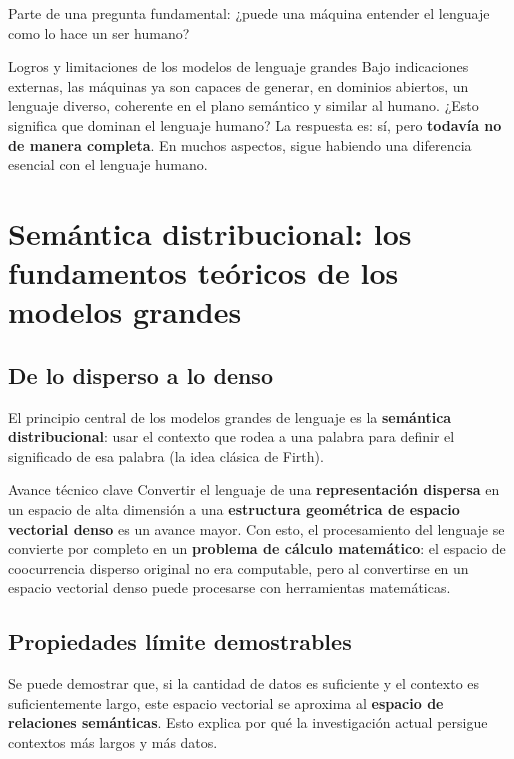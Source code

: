 \documentclass[a4paper]{article}
\begin{document}
Parte de una pregunta fundamental: ¿puede una máquina entender el lenguaje como lo hace un ser humano?

\begin{importantbox}{Logros y limitaciones de los modelos de lenguaje grandes}
Bajo indicaciones externas, las máquinas ya son capaces de generar, en dominios abiertos, un lenguaje diverso, coherente en el plano semántico y similar al humano. ¿Esto significa que dominan el lenguaje humano? La respuesta es: sí, pero \textbf{todavía no de manera completa}. En muchos aspectos, sigue habiendo una diferencia esencial con el lenguaje humano.
\end{importantbox}


\section{Semántica distribucional: los fundamentos teóricos de los modelos grandes}

\subsection{De lo disperso a lo denso}

El principio central de los modelos grandes de lenguaje es la \textbf{semántica distribucional}: usar el contexto que rodea a una palabra para definir el significado de esa palabra (la idea clásica de Firth).

\begin{knowledgebox}{Avance técnico clave}
Convertir el lenguaje de una \textbf{representación dispersa} en un espacio de alta dimensión a una \textbf{estructura geométrica de espacio vectorial denso} es un avance mayor. Con esto, el procesamiento del lenguaje se convierte por completo en un \textbf{problema de cálculo matemático}: el espacio de coocurrencia disperso original no era computable, pero al convertirse en un espacio vectorial denso puede procesarse con herramientas matemáticas.
\end{knowledgebox}

\subsection{Propiedades límite demostrables}

Se puede demostrar que, si la cantidad de datos es suficiente y el contexto es suficientemente largo, este espacio vectorial se aproxima al \textbf{espacio de relaciones semánticas}. Esto explica por qué la investigación actual persigue contextos más largos y más datos.
\end{document}
